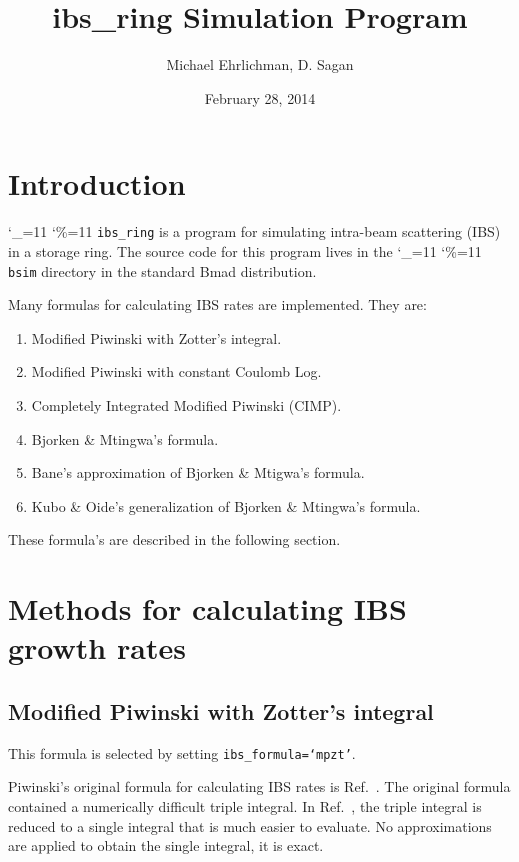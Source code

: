 \documentclass[11pt]{article}
\title{ibs_ring Simulation Program}
\author{Michael Ehrlichman, D. Sagan}
\date{February 28, 2014}
\newcommand\ttcmd{\begingroup\catcode`\_=11 \catcode`\%=11 \dottcmd}
\newcommand\dottcmd[1]{\texttt{#1}\endgroup}
\newcommand{\vn}{\ttcmd}
\begin{document}
\maketitle

\tableofcontents

\section{Introduction} 
\label{s:intro}

\vn{ibs_ring} is a program for simulating intra-beam scattering (IBS) in a storage ring.
The source code for this program lives in the \vn{bsim} directory in
the standard Bmad\cite{b:bmad} distribution.

Many formulas for calculating IBS rates are implemented.  They are:
\begin{enumerate}
\item Modified Piwinski with Zotter's integral.
\item Modified Piwinski with constant Coulomb Log.
\item Completely Integrated Modified Piwinski (CIMP).
\item Bjorken \& Mtingwa's formula.
\item Bane's approximation of Bjorken \& Mtigwa's formula.
\item Kubo \& Oide's generalization of Bjorken \& Mtingwa's formula.
\end{enumerate}
These formula's are described in the following section.

\section{Methods for calculating IBS growth rates}

\subsection{Modified Piwinski with Zotter's integral}
This formula is selected by setting {\tt ibs_formula=`mpzt'}.

Piwinski's original formula for calculating IBS rates is Ref.~\cite{b:pw}.  The
original formula contained a numerically difficult triple integral.  In
Ref.~\cite{b:zotter}, the triple integral is reduced to a single integral that is 
much easier to evaluate.  No 
approximations are applied to obtain the single integral, it is exact.
\end{document}
